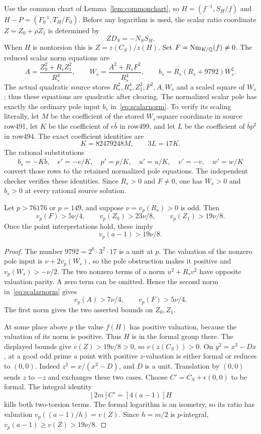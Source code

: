 \documentclass[11pt,a4paper]{article}
\newcommand{\Q}{\mathbb Q}\newcommand{\Z}{\mathbb Z}\newcommand{\HH}{\mathcal H}
\begin{document}
Use the common chart of Lemma~\ref{lem:commonchart}, so
$H=(f^{-1},S_H/f)$ and $H-P=(F_0^{-1},T_H/F_0)$.
Before any logarithm is used, the scalar ratio
coordinate $Z=Z_0+\rho Z_1$ is determined by
\[
                         ZD_S=-N_SS_H.
\]
When $H$ is nontorsion this is $Z=z(C_S)/z(H)$.
Set $F=\Nm_{K/\Q}(f)\ne0$. The reduced scalar norm equations are
\begin{equation}\label{eq:scalarnorm}
 A=\frac{Z_0^2+R_sZ_1^2}{R_s^4},\qquad
 W_s=\frac{A^2+R_sF^2}{R_s^4},\qquad
 b_s=R_s(R_s+9792)W_s^2.
\end{equation}
The actual quadratic source stores $R_s^2,R_s^4,Z_1^2,F^2,A,W_s$
and a scaled square of $W_s$; thus these equations are quadratic after
clearing. The normalized scalar pole has exactly the ordinary pole
input $b_s$ in~\eqref{eq:scalarnorm}. To verify its scaling literally,
let $M$ be the coefficient of the stored $W_s$-square coordinate in
source row491, let $K$ be the coefficient of $e\bar b$ in row499,
and let $L$ be the coefficient of $\bar b p^2$ in row494. The exact
coefficient identities are
\[
                  K=82479248M,\qquad 3L=17K.
\]
The rational substitutions
\[
 b_s=-K\bar b,\quad e'=-e/K,\quad p'=p/K,\quad
 u'=u/K,\quad v'=-v,\quad w'=w/K
\]
convert those rows to the retained normalized pole equations. The
independent checker verifies these identities. Since $R_s>0$ and
$F\ne0$, one has $W_s>0$ and $b_s>0$ at every rational source solution.

\begin{lemma}\label{lem:scalarextract}
Let $p>76176$ or $p=149$, and suppose $\nu=v_p(R_s)>0$ is odd. Then
\[
 v_p(F)>5\nu/4,\qquad
 v_p(Z_0)>23\nu/8,\qquad v_p(Z_1)>19\nu/8.
\]
Once the point interpretations hold, these imply
\[
                v_p(a-1)>19\nu/8.
\]
\end{lemma}
\begin{proof}
The number $9792=2^6\cdot3^2\cdot17$ is a unit at $p$.
The valuation of the nonzero pole input is
$\nu+2v_p(W_s)$, so the pole obstruction makes it positive and
$v_p(W_s)>-\nu/2$.
The two nonzero terms of a norm $u^2+R_sv^2$ have opposite
valuation parity. A zero term can be omitted. Hence the second
norm in~\eqref{eq:scalarnorm} gives
\[
 v_p(A)>7\nu/4,\qquad v_p(F)>5\nu/4.
\]
The first norm gives the two asserted bounds on $Z_0,Z_1$.

At some place above $p$ the value $f(H)$ has positive valuation,
because the valuation of its norm is positive. Thus $H$ is in the
formal group there. The displayed bounds give $v(Z)>19\nu/8>0$,
so $v(z(C_S))>0$. On $y^2=x^3-Dx$, at a good odd prime a point
with positive $z$-valuation is either formal or reduces to $(0,0)$.
Indeed $z^2=x/(x^2-D)$, and $D$ is a unit. Translation by $(0,0)$
sends $z$ to $-z$ and exchanges these two cases. Choose
$C'=C_S+\epsilon(0,0)$ to be formal. The integral identity
\[
                       [2m]C'=[4(a-1)]H
\]
kills both two-torsion terms. The formal logarithm is an isometry,
so its ratio has valuation $v_p((a-1)/h)=v(Z)$. Since $h=m/2$ is
$p$-integral, $v_p(a-1)\ge v(Z)>19\nu/8$.
\end{proof}
\end{document}
